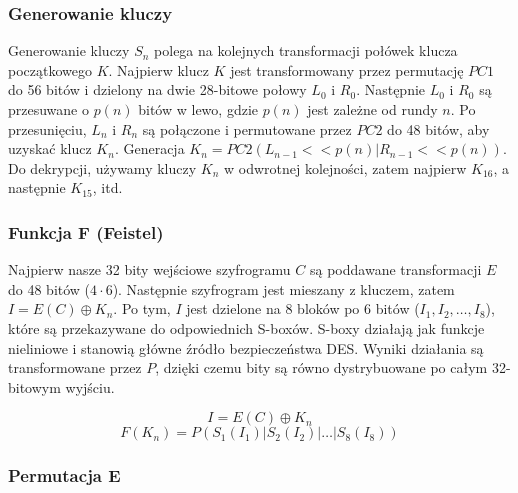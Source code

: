 \documentclass{../notatki}
\begin{document}
\subsubsection{Generowanie kluczy}

Generowanie kluczy $S_n$ polega na kolejnych transformacji połówek
klucza początkowego $K$. Najpierw klucz $K$ jest transformowany przez
permutację $PC1$ do 56 bitów i dzielony na dwie 28-bitowe połowy $L_0$ i $R_0$.
Następnie $L_0$ i $R_0$ są przesuwane o $p(n)$ bitów w lewo, gdzie $p(n)$
jest zależne od rundy $n$. Po przesunięciu, $L_n$ i $R_n$ są
połączone i permutowane przez $PC2$ do 48 bitów, aby uzyskać klucz
$K_n$. Generacja $K_n = PC2(L_{n - 1} << p(n) | R_{n - 1} << p(n))$.
Do dekrypcji, używamy kluczy $K_n$ w odwrotnej kolejności, zatem najpierw
$K_{16}$, a następnie $K_{15}$, itd.

\subsubsection{Funkcja F (Feistel)}

Najpierw nasze 32 bity wejściowe szyfrogramu $C$ są poddawane transformacji $E$
do 48 bitów ($4 \cdot 6$). Następnie szyfrogram jest mieszany z
kluczem, zatem $I = E(C) \oplus K_n$. Po tym, $I$
jest dzielone na 8 bloków po 6 bitów ($I_1, I_2, \ldots, I_8$), które
są przekazywane do odpowiednich S-boxów. S-boxy działają jak funkcje
nieliniowe i stanowią główne źródło bezpieczeństwa DES. Wyniki działania są
transformowane przez $P$, dzięki czemu bity są równo dystrybuowane po
całym 32-bitowym wyjściu.

$$
I = E(C) \oplus K_n
$$
$$
F(K_n) = P(S_1(I_1) | S_2(I_2) | \ldots | S_8(I_8))
$$

\subsubsection{Permutacja E}
\end{document}
